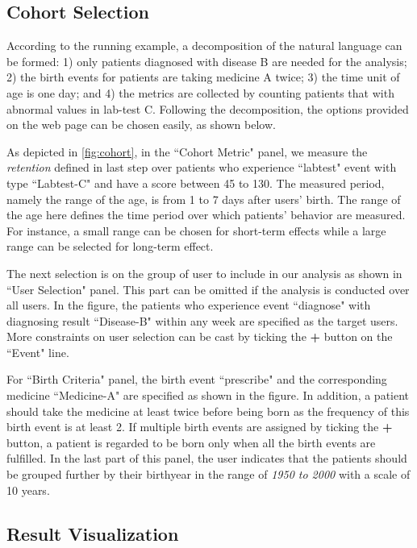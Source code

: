 \subsection{Cohort Selection}

According to the running example, a decomposition of the natural language can be formed: 1) only patients diagnosed with disease B are needed for the analysis; 2) the birth events for patients are taking medicine A twice; 3) the time unit of age is one day; and 4) the metrics are collected by counting patients that with abnormal values in lab-test C. 
Following the decomposition, the options provided on the web page can be chosen easily, as shown below.

As depicted in \ref{fig:cohort}, in the ``Cohort Metric" panel, we measure the \emph{retention} defined in last step over patients who experience ``labtest" event with type ``Labtest-C" and have a score between 45 to 130. 
The measured period, namely the range of the age, is from 1 to 7 days after users' birth.
The range of the age here defines the time period over which patients' behavior are measured. For instance, a small range can be chosen for short-term effects while a large range can be selected for long-term effect.

The next selection is on the group of user to include in our analysis as shown in ``User Selection" panel. This part can be omitted if the analysis is conducted over all users. 
In the figure, the patients who experience event ``diagnose" with diagnosing result ``Disease-B" within any week are specified as the target users.
More constraints on user selection can be cast by ticking the \textbf{+} button on the ``Event" line.

For ``Birth Criteria" panel, the birth event ``prescribe" and the corresponding medicine ``Medicine-A" are specified as shown in the figure.
In addition, a patient should take the medicine at least twice before being 
born as the frequency of this birth event is at least 2.
If multiple birth events are assigned by ticking the \textbf{+} button, a 
patient is regarded to be born only when all the birth events are fulfilled. 
In the last part of this panel, the user indicates that the patients should be grouped further by their birthyear in the range of \emph{1950 to 2000} with a scale of 10 years.

\subsection{Result Visualization}

